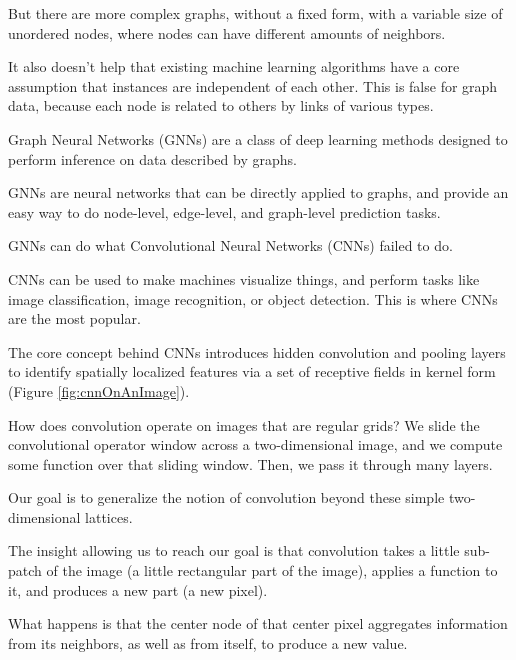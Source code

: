 But there are more complex graphs, without a fixed form, with a variable size of
unordered nodes, where nodes can have different amounts of neighbors.
\newline

It also doesn’t help that existing machine learning algorithms have a core assumption
that instances are independent of each other. This is false for graph data, because
each node is related to others by links of various types.
\newline

Graph Neural Networks (GNNs) are a class of deep learning methods designed to perform
inference on data described by graphs.
\newline

GNNs are neural networks that can be directly applied to graphs, and provide an
easy way to do node-level, edge-level, and graph-level prediction tasks.
\newline

GNNs can do what Convolutional Neural Networks (CNNs) failed to do.
\newline

CNNs can be used to make machines visualize things, and perform tasks like image
classification, image recognition, or object detection. This is where CNNs are
the most popular.
\newline

The core concept behind CNNs introduces hidden convolution and pooling layers to
identify spatially localized features via a set of receptive fields in kernel
form (Figure \ref{fig:cnnOnAnImage}).
\newline

How does convolution operate on images that are regular grids? We slide the convolutional
operator window across a two-dimensional image, and we compute some function
over that sliding window. Then, we pass it through many layers.
\newline

Our goal is to generalize the notion of convolution beyond these simple two-dimensional
lattices.
\newline

The insight allowing us to reach our goal is that convolution takes a little sub-patch
of the image (a little rectangular part of the image), applies a function to it,
and produces a new part (a new pixel).
\newline

What happens is that the center node of that center pixel aggregates information
from its neighbors, as well as from itself, to produce a new value.
\newline

